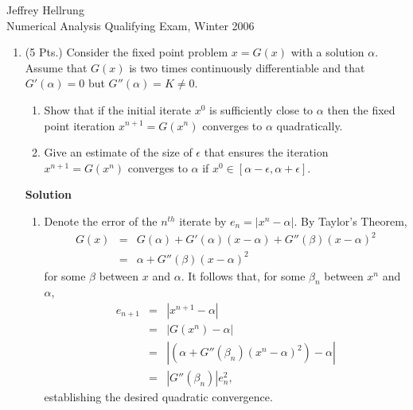 \documentclass{article}
\begin{document}
\begin{flushright}
Jeffrey Hellrung \\
Numerical Analysis Qualifying Exam, Winter 2006 \\
\end{flushright}


\begin{enumerate}

\item (5 Pts.) Consider the fixed point problem \(x = G(x)\) with a solution \(\alpha\).  Assume that \(G(x)\) is two times continuously differentiable and that \(G'(\alpha) = 0\) but \(G''(\alpha) = K \neq 0\).

\begin{enumerate}
\item Show that if the initial iterate \(x^0\) is sufficiently close to \(\alpha\) then the fixed point iteration \(x^{n + 1} = G(x^n)\) converges to \(\alpha\) quadratically.

\item Give an estimate of the size of \(\epsilon\) that ensures the iteration \(x^{n + 1} = G(x^n)\) converges to \(\alpha\) if \(x^0 \in [\alpha - \epsilon, \alpha + \epsilon]\).

\end{enumerate}

{\bf Solution}

\begin{enumerate}
\item Denote the error of the \(n^{th}\) iterate by \(e_n = \left| x^n - \alpha \right|\).  By Taylor's Theorem,
\begin{eqnarray*}
G(x) & = & G(\alpha) + G'(\alpha) (x - \alpha) + G''(\beta) (x - \alpha)^2 \\
     & = & \alpha + G''(\beta) (x - \alpha)^2
\end{eqnarray*}
for some \(\beta\) between \(x\) and \(\alpha\).  It follows that, for some \(\beta_n\) between \(x^n\) and \(\alpha\),
\begin{eqnarray*}
e_{n + 1} & = & \left| x^{n + 1} - \alpha \right| \\
          & = & \left| G(x^n) - \alpha \right| \\
          & = & \left| \left( \alpha + G''(\beta_n) (x^n - \alpha)^2 \right) - \alpha \right| \\
          & = & \left| G''(\beta_n) \right| e_n^2,
\end{eqnarray*}
establishing the desired quadratic convergence.


\end{enumerate}
\end{enumerate}
\end{document}
